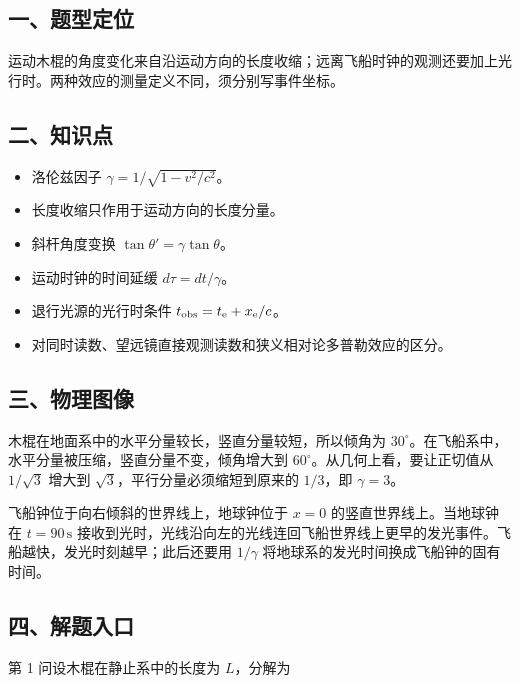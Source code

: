 \documentclass[12pt,a4paper,UTF8]{ctexart}
\newcommand{\tightlist}{\setlength{\itemsep}{0pt}\setlength{\parskip}{0pt}}
\begin{document}
\subsection{一、题型定位}\label{ux4e00ux9898ux578bux5b9aux4f4d-7}

运动木棍的角度变化来自沿运动方向的长度收缩；远离飞船时钟的观测还要加上光行时。两种效应的测量定义不同，须分别写事件坐标。

\subsection{二、知识点}\label{ux4e8cux77e5ux8bc6ux70b9-7}

\begin{itemize}
\tightlist
\item
  洛伦兹因子 \(\gamma=1/\sqrt{1-v^2/c^2}\)。
\item
  长度收缩只作用于运动方向的长度分量。
\item
  斜杆角度变换 \(\tan\theta'=\gamma\tan\theta\)。
\item
  运动时钟的时间延缓 \(d\tau=dt/\gamma\)。
\item
  退行光源的光行时条件 \(t_{\rm obs}=t_{\rm e}+x_{\rm e}/c\)。
\item
  对同时读数、望远镜直接观测读数和狭义相对论多普勒效应的区分。
\end{itemize}

\subsection{三、物理图像}\label{ux4e09ux7269ux7406ux56feux50cf-7}

木棍在地面系中的水平分量较长，竖直分量较短，所以倾角为
\(30^\circ\)。在飞船系中，水平分量被压缩，竖直分量不变，倾角增大到
\(60^\circ\)。从几何上看，要让正切值从 \(1/\sqrt3\) 增大到
\(\sqrt3\)，平行分量必须缩短到原来的 \(1/3\)，即 \(\gamma=3\)。

飞船钟位于向右倾斜的世界线上，地球钟位于 \(x=0\)
的竖直世界线上。当地球钟在 \(t=90\,\mathrm s\)
接收到光时，光线沿向左的光线连回飞船世界线上更早的发光事件。飞船越快，发光时刻越早；此后还要用
\(1/\gamma\) 将地球系的发光时间换成飞船钟的固有时间。

\subsection{四、解题入口}\label{ux56dbux89e3ux9898ux5165ux53e3-7}

第 1 问设木棍在静止系中的长度为 \(L\)，分解为
\end{document}
